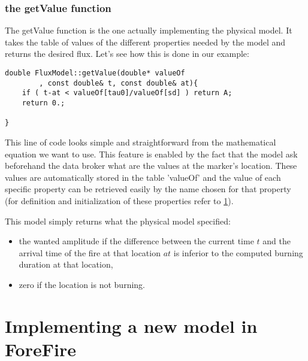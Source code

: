 \begin{center}
\end{center}

\subsection*{the getValue function}

The getValue function is the one actually implementing the physical model. It takes the table of values of the different properties needed by the model and returns the desired flux. Let's see how this is done in our example:
\begin{lstlisting}[caption={getValue},frame=single]
double FluxModel::getValue(double* valueOf
		, const double& t, const double& at){
	if ( t-at < valueOf[tau0]/valueOf[sd] ) return A;
	return 0.;

}
\end{lstlisting}

This line of code looks simple and straightforward from the mathematical equation we want to use. This feature is enabled by the fact that the model ask beforehand the data broker what are the values at the marker's location. These values are automatically stored in the table 'valueOf' and the value of each specific property can be retrieved easily by the name chosen for that property (for definition and initialization of these properties refer to \ref{sec:newModel}).

This model simply returns what the physical model specified:
\begin{itemize}
	\item the wanted amplitude if the difference between the current time $t$ and the arrival time of the fire at that location $at$ is inferior to the computed burning duration at that location,
	\item zero if the location is not burning.
\end{itemize} 


\chapter{Implementing a new model in ForeFire}
\label{sec:newModel}

